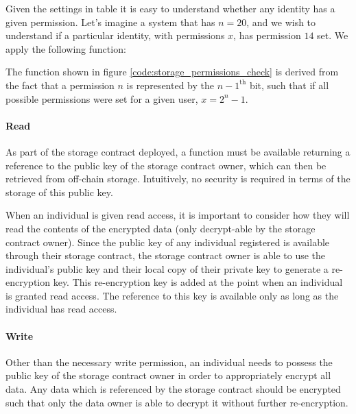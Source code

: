Given the settings in table it is easy to understand whether any identity has a given permission. Let's imagine a system that has $n = 20$, and we wish to understand if a particular identity, with permissions $x$, has permission $14$ set. We apply the following function:



The function shown in figure \ref{code:storage_permissions_check} is derived from the fact that a permission $n$ is represented by the $n-1^{\text{th}}$ bit, such that if all possible permissions were set for a given user, $x = 2^{n} - 1$. 

\paragraph{Read}

As part of the storage contract deployed, a function must be available returning a reference to the public key of the storage contract owner, which can then be retrieved from off-chain storage. Intuitively, no security is required in terms of the storage of this public key.

When an individual is given read access, it is important to consider how they will read the contents of the encrypted data (only decrypt-able by the storage contract owner). Since the public key of any individual registered is available through their storage contract, the storage contract owner is able to use the individual's public key and their local copy of their private key to generate a re-encryption key. This re-encryption key is added at the point when an individual is granted read access. The reference to this key is available only as long as the individual has read access.



\paragraph{Write}

Other than the necessary write permission, an individual needs to possess the public key of the storage contract owner in order to appropriately encrypt all data. Any data which is referenced by the storage contract should be encrypted such that only the data owner is able to decrypt it without further re-encryption.

